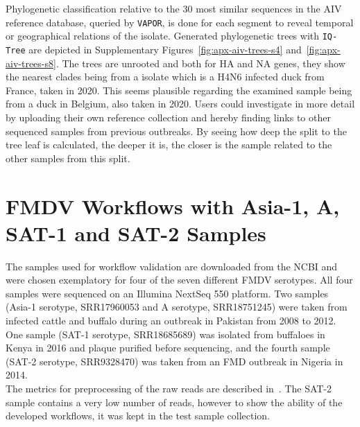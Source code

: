 Phylogenetic classification relative to the 30 most similar sequences in the \ac{AIV} reference database, queried by \texttt{VAPOR}, is done for each segment to reveal temporal or geographical relations of the isolate. Generated phylogenetic trees with \texttt{IQ-Tree} are depicted in Supplementary Figures~\ref{fig:apx-aiv-trees-s4} and~\ref{fig:apx-aiv-trees-s8}. The trees are unrooted and both for \ac{HA} and \ac{NA} genes, they show the nearest clades being from a isolate which is a H4N6 infected duck from France, taken in 2020. This seems plausible regarding the examined sample being from a duck in Belgium, also taken in 2020. Users could investigate in more detail by uploading their own reference collection and hereby finding links to other sequenced samples from previous outbreaks. By seeing how deep the split to the tree leaf is calculated, the deeper it is, the closer is the sample related to the other samples from this split.

\section{FMDV Workflows with Asia-1, A, SAT-1 and SAT-2 Samples}
The samples used for workflow validation are downloaded from the \ac{NCBI} and were chosen exemplatory for four of the seven different \ac{FMDV} serotypes. All four samples were sequenced on an Illumina NextSeq 550 platform. Two samples (Asia-1 serotype, SRR17960053 and A serotype, SRR18751245) were taken from infected cattle and buffalo during an outbreak in Pakistan from 2008 to 2012. One sample (SAT-1 serotype, SRR18685689) was isolated from buffaloes in Kenya in 2016 and plaque purified before sequencing, and the fourth sample (SAT-2 serotype, SRR9328470) was taken from an \ac{FMD} outbreak in Nigeria in 2014. \\
The metrics for preprocessing of the raw reads are described in~. The SAT-2 sample contains a very low number of reads, however to show the ability of the developed workflows, it was kept in the test sample collection. 
\\


